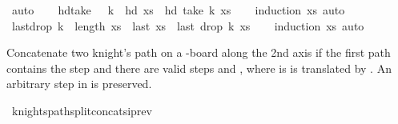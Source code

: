 \begin{isabellebody}
\ auto\isanewline
{}\isamarkupfalse%
%
\endisatagproof
{\isafoldproof}%
%
\isadelimproof
\isanewline
%
\endisadelimproof
\ \ \isanewline
{}\isamarkupfalse%
\ hd{\isacharunderscore}{\kern0pt}take{\isacharcolon}{\kern0pt}\ {\isachardoublequoteopen}{}\ {\isacharless}{\kern0pt}\ k\ {\isasymLongrightarrow}\ hd\ xs\ {\isacharequal}{\kern0pt}\ hd\ {\isacharparenleft}{\kern0pt}take\ k\ xs{\isacharparenright}{\kern0pt}{\isachardoublequoteclose}\isanewline
%
\isadelimproof
\ \ %
\endisadelimproof
%
\isatagproof
{}\isamarkupfalse%
\ {\isacharparenleft}{\kern0pt}induction\ xs{\isacharparenright}{\kern0pt}\ auto%
\endisatagproof
{\isafoldproof}%
%
\isadelimproof
\isanewline
%
\endisadelimproof
\isanewline
{}\isamarkupfalse%
\ last{\isacharunderscore}{\kern0pt}drop{\isacharcolon}{\kern0pt}\ {\isachardoublequoteopen}k\ {\isacharless}{\kern0pt}\ length\ xs\ {\isasymLongrightarrow}\ last\ xs\ {\isacharequal}{\kern0pt}\ last\ {\isacharparenleft}{\kern0pt}drop\ k\ xs{\isacharparenright}{\kern0pt}{\isachardoublequoteclose}\isanewline
%
\isadelimproof
\ \ %
\endisadelimproof
%
\isatagproof
{}\isamarkupfalse%
\ {\isacharparenleft}{\kern0pt}induction\ xs{\isacharparenright}{\kern0pt}\ auto%
\endisatagproof
{\isafoldproof}%
%
\isadelimproof
%
\endisadelimproof
%
\isadelimdocument
%
\endisadelimdocument
%
\isatagdocument
%
\isamarkuptrue%
%
\endisatagdocument
{\isafolddocument}%
%
\isadelimdocument
%
\endisadelimdocument
%
\begin{isamarkuptext}%
Concatenate two knight's path on a -board along the 2nd axis if the first path contains
the step  and there are valid steps  and , where 
 is  is translated by . An arbitrary step in  is preserved.%
\end{isamarkuptext}\isamarkuptrue%
\isamarkupfalse%
\ knights{\isacharunderscore}{\kern0pt}path{\isacharunderscore}{\kern0pt}split{\isacharunderscore}{\kern0pt}concat{\isacharunderscore}{\kern0pt}si{\isacharunderscore}{\kern0pt}prev{\isacharcolon}{\kern0pt}\isanewline

\end{isabellebody}
